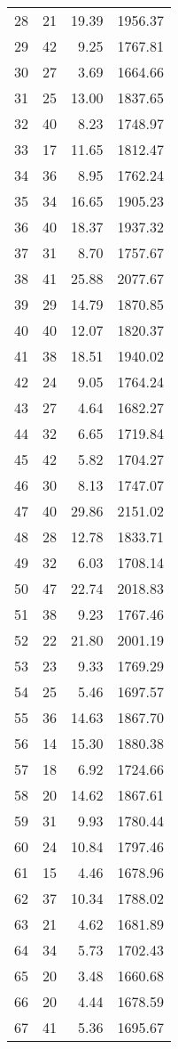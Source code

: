 \begin{appendix}
\begin{compacttable}
\begin{longtable}{@{}rrrr@{}}
28 & 21 & 19.39 & 1956.37 \\
29 & 42 & 9.25 & 1767.81 \\
30 & 27 & 3.69 & 1664.66 \\
31 & 25 & 13.00 & 1837.65 \\
32 & 40 & 8.23 & 1748.97 \\
33 & 17 & 11.65 & 1812.47 \\
34 & 36 & 8.95 & 1762.24 \\
35 & 34 & 16.65 & 1905.23 \\
36 & 40 & 18.37 & 1937.32 \\
37 & 31 & 8.70 & 1757.67 \\
38 & 41 & 25.88 & 2077.67 \\
39 & 29 & 14.79 & 1870.85 \\
40 & 40 & 12.07 & 1820.37 \\
41 & 38 & 18.51 & 1940.02 \\
42 & 24 & 9.05 & 1764.24 \\
43 & 27 & 4.64 & 1682.27 \\
44 & 32 & 6.65 & 1719.84 \\
45 & 42 & 5.82 & 1704.27 \\
46 & 30 & 8.13 & 1747.07 \\
47 & 40 & 29.86 & 2151.02 \\
48 & 28 & 12.78 & 1833.71 \\
49 & 32 & 6.03 & 1708.14 \\
50 & 47 & 22.74 & 2018.83 \\
51 & 38 & 9.23 & 1767.46 \\
52 & 22 & 21.80 & 2001.19 \\
53 & 23 & 9.33 & 1769.29 \\
54 & 25 & 5.46 & 1697.57 \\
55 & 36 & 14.63 & 1867.70 \\
56 & 14 & 15.30 & 1880.38 \\
57 & 18 & 6.92 & 1724.66 \\
58 & 20 & 14.62 & 1867.61 \\
59 & 31 & 9.93 & 1780.44 \\
60 & 24 & 10.84 & 1797.46 \\
61 & 15 & 4.46 & 1678.96 \\
62 & 37 & 10.34 & 1788.02 \\
63 & 21 & 4.62 & 1681.89 \\
64 & 34 & 5.73 & 1702.43 \\
65 & 20 & 3.48 & 1660.68 \\
66 & 20 & 4.44 & 1678.59 \\
67 & 41 & 5.36 & 1695.67 \\
\end{longtable}
\end{compacttable}


\end{appendix}
